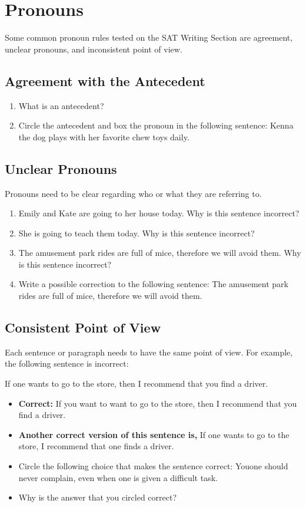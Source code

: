 \section{Pronouns}
Some common pronoun rules tested on the SAT Writing Section are agreement, unclear pronouns,
and inconsistent point of view.

\subsection{Agreement with the Antecedent}
\begin{enumerate}
\item{What is an antecedent?} \hrulefill
\item{Circle the antecedent and box the pronoun in the following sentence: Kenna the dog plays
with her favorite chew toys daily.}

\end{enumerate} 

\subsection{Unclear Pronouns}
Pronouns need to be clear regarding who or what they are referring to.
\begin{enumerate}
\item Emily and Kate are going to her house today. Why is this sentence incorrect?

\hrulefill
\item She is going to teach them today. Why is this sentence incorrect?

\hrulefill
\item The amusement park rides are full of mice, therefore we will avoid them. Why is this sentence
incorrect?

\hrulefill
\item Write a possible correction to the following sentence: The amusement park rides are full of
mice, therefore we will avoid them.

\hrulefill
\end{enumerate}

\subsection{Consistent Point of View}
Each sentence or paragraph needs to have the same point of view. For example, the following
sentence is incorrect: 

\bigskip
If one wants to go to the store, then I recommend that you find a driver.

\begin{itemize}
\item{\textbf{Correct:} If you want to want to go to the store, then I recommend that you find a driver.}
\item{\textbf{Another correct version of this sentence is,} If one wants to go to the store, I recommend that
one finds a driver.}
\item{Circle the following choice that makes the sentence correct: You\/one should never complain, even when one is given a difficult task.}
\item{Why is the answer that you circled correct?} \hrulefill
\end{itemize}